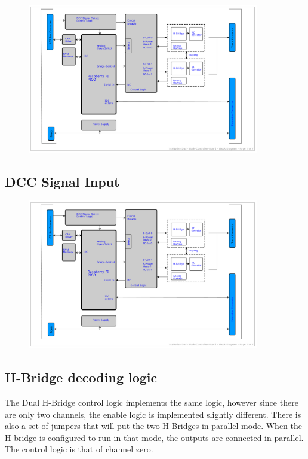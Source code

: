 \begin{figure}[htbp]
    \centering
    \includegraphics[page=2, width=0.9\textwidth]{./Schematics/Schematic_LcsNodes-Dual-Block-Controller.pdf}
\end{figure}
\FloatBarrier


\subsection{DCC Signal Input}

\begin{figure}[htbp]
    \centering
    \includegraphics[page=3, width=0.9\textwidth]{./Schematics/Schematic_LcsNodes-Dual-Block-Controller.pdf}
\end{figure}
\FloatBarrier

\subsection{H-Bridge decoding logic}

The Dual H-Bridge control logic implements the same logic, however since there are only two channels, the enable logic is implemented slightly different. There is also a set of jumpers that will put the two H-Bridges in parallel mode. When the H-bridge is configured to run in that mode, the outputs are connected in parallel. The control logic is that of channel zero.

